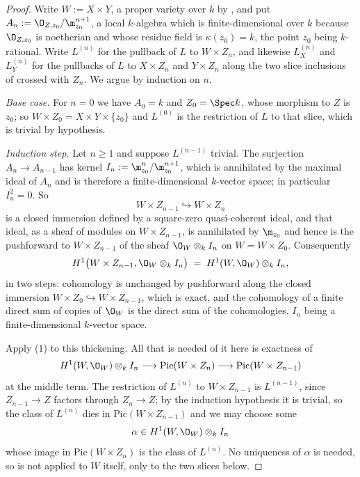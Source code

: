 \begin{proof}
Write $W:=X\times Y$, a proper variety over $k$ by
, and put
$A_n:=\O_{Z,z_0}/\m_{z_0}^{n+1}$, a local $k$-algebra which is
finite-dimensional over $k$ because $\O_{Z,z_0}$ is noetherian and whose
residue field is $\kappa(z_0)=k$, the point $z_0$ being $k$-rational.  Write
$L^{(n)}$ for the pullback of $L$ to $W\times Z_n$, and likewise
$L_X^{(n)}$ and $L_Y^{(n)}$ for the pullbacks of $L$ to $X\times Z_n$ and
$Y\times Z_n$ along the two slice inclusions of 
crossed with $Z_n$.  We argue by induction on $n$.

\emph{Base case.}  For $n=0$ we have $A_0=k$ and $Z_0=\Spec k$, whose morphism
to $Z$ is $z_0$; so $W\times Z_0=X\times Y\times\{z_0\}$ and $L^{(0)}$ is the
restriction of $L$ to that slice, which is trivial by hypothesis.

\emph{Induction step.}  Let $n\geq1$ and suppose $L^{(n-1)}$ trivial.  The
surjection $A_n\to A_{n-1}$ has kernel $I_n:=\m_{z_0}^n/\m_{z_0}^{n+1}$, which
is annihilated by the maximal ideal of $A_n$ and is therefore a
finite-dimensional $k$-vector space; in particular $I_n^2=0$.  So
\[
  W\times Z_{n-1}\hookrightarrow W\times Z_n
\]
is a closed immersion defined by a square-zero quasi-coherent ideal, and that
ideal, as a sheaf of modules on $W\times Z_{n-1}$, is annihilated by
$\m_{z_0}$ and hence is the pushforward to $W\times Z_{n-1}$ of the sheaf
$\O_W\otimes_kI_n$ on $W=W\times Z_0$.  Consequently
\[
  H^1\bigl(W\times Z_{n-1},\O_W\otimes_kI_n\bigr)
  \;=\;H^1(W,\O_W)\otimes_kI_n ,
\]
in two steps: cohomology is unchanged by pushforward along the closed
immersion $W\times Z_0\hookrightarrow W\times Z_{n-1}$, which is exact, and
the cohomology of a finite direct sum of copies of $\O_W$ is the direct sum
of the cohomologies, $I_n$ being a finite-dimensional $k$-vector space.

Apply (1) to this thickening.  All that is
needed of it here is exactness of
\[
  H^1(W,\O_W)\otimes_kI_n\longrightarrow
  \mathrm{Pic}(W\times Z_n)\longrightarrow\mathrm{Pic}(W\times Z_{n-1})
\]
at the middle term.  The restriction of $L^{(n)}$ to $W\times Z_{n-1}$ is
$L^{(n-1)}$, since $Z_{n-1}\to Z$ factors through $Z_n\to Z$; by the induction
hypothesis it is trivial, so the class of $L^{(n)}$ dies in
$\mathrm{Pic}(W\times Z_{n-1})$ and we may choose some
\[
  \alpha\in H^1(W,\O_W)\otimes_kI_n
\]
whose image in $\mathrm{Pic}(W\times Z_n)$ is the class of $L^{(n)}$.  No
uniqueness of $\alpha$ is needed, so
 is not applied to $W$ itself, only
to the two slices below.


\end{proof}
